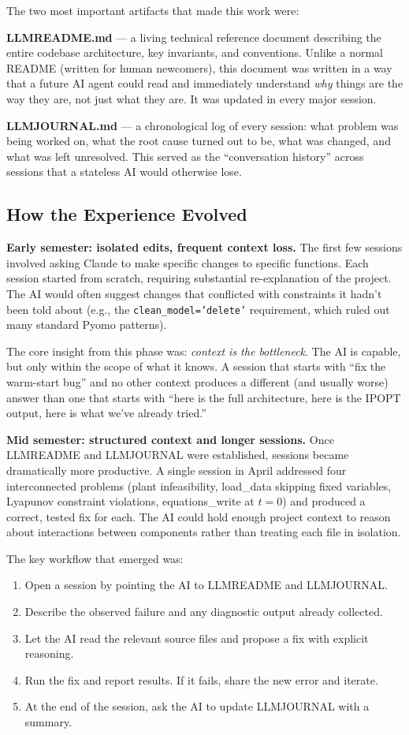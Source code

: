 \documentclass[11pt,letterpaper]{article}
\begin{document}
The two most important artifacts that made this work were:

\textbf{LLMREADME.md} --- a living technical reference document describing the entire codebase architecture, key invariants, and conventions. Unlike a normal README (written for human newcomers), this document was written in a way that a future AI agent could read and immediately understand \emph{why} things are the way they are, not just what they are. It was updated in every major session.

\textbf{LLMJOURNAL.md} --- a chronological log of every session: what problem was being worked on, what the root cause turned out to be, what was changed, and what was left unresolved. This served as the ``conversation history'' across sessions that a stateless AI would otherwise lose.

\subsection{How the Experience Evolved}

\textbf{Early semester: isolated edits, frequent context loss.} The first few sessions involved asking Claude to make specific changes to specific functions. Each session started from scratch, requiring substantial re-explanation of the project. The AI would often suggest changes that conflicted with constraints it hadn't been told about (e.g., the \texttt{clean\_model='delete'} requirement, which ruled out many standard Pyomo patterns).

The core insight from this phase was: \emph{context is the bottleneck}. The AI is capable, but only within the scope of what it knows. A session that starts with ``fix the warm-start bug'' and no other context produces a different (and usually worse) answer than one that starts with ``here is the full architecture, here is the IPOPT output, here is what we've already tried.''

\textbf{Mid semester: structured context and longer sessions.} Once LLMREADME and LLMJOURNAL were established, sessions became dramatically more productive. A single session in April addressed four interconnected problems (plant infeasibility, load\_data skipping fixed variables, Lyapunov constraint violations, equations\_write at $t=0$) and produced a correct, tested fix for each. The AI could hold enough project context to reason about interactions between components rather than treating each file in isolation.

The key workflow that emerged was:
\begin{enumerate}[leftmargin=2em]
  \item Open a session by pointing the AI to LLMREADME and LLMJOURNAL.
  \item Describe the observed failure and any diagnostic output already collected.
  \item Let the AI read the relevant source files and propose a fix with explicit reasoning.
  \item Run the fix and report results. If it fails, share the new error and iterate.
  \item At the end of the session, ask the AI to update LLMJOURNAL with a summary.
\end{enumerate}
\end{document}
